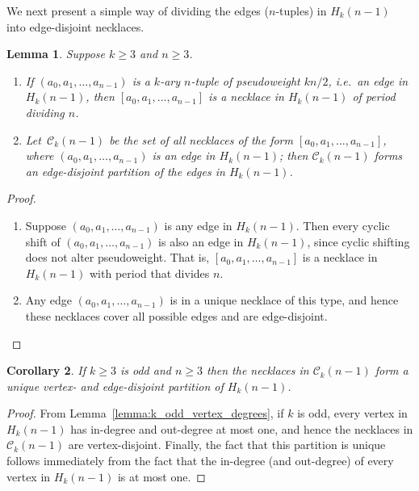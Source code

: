 \documentclass[a4paper,11pt]{article}
\theoremstyle{plain}
\newtheorem{lemma}{Lemma}[section]
\newtheorem{corollary}[lemma]{Corollary}
\theoremstyle{definition}
\theoremstyle{remark}
\begin{document}
We next present a simple way of dividing the edges ($n$-tuples) in $H_k(n-1)$ into edge-disjoint
necklaces.

\begin{lemma}  \label{lemma:k_odd_partitioning edges}  \label{lemma:defining_circuits}
Suppose $k\geq3$ and $n\geq 3$.
\begin{enumerate}
\item[i)] If $(a_0,a_1,\dots,a_{n-1})$ is a $k$-ary $n$-tuple of pseudoweight $kn/2$, i.e.\ an
    edge in $H_k(n-1)$, then $[a_0,a_1,\dots,a_{n-1}]$ is a necklace in $H_k(n-1)$ of
     period dividing $n$.
\item[ii)] Let~$\mathcal{C}_k(n-1)$ be the set of all necklaces of the form
    $[a_0,a_1,\dots,a_{n-1}]$, where $(a_0,a_1,\dots,a_{n-1})$ is an edge in $H_k(n-1)$; then
    $\mathcal{C}_k(n-1)$ forms an edge-disjoint partition of the edges in $H_k(n-1)$.
\end{enumerate}
\end{lemma}

\begin{proof}
\begin{enumerate}
\item[i)] Suppose $(a_0,a_1,\dots,a_{n-1})$ is any edge in $H_k(n-1)$.  Then every cyclic shift
    of $(a_0,a_1,\dots,a_{n-1})$ is also an edge in $H_k(n-1)$, since cyclic shifting does not
    alter pseudoweight.  That is, $[a_0,a_1,\dots,a_{n-1}]$ is a necklace in $H_k(n-1)$ with
    period that divides $n$.
\item[ii)] Any edge $(a_0,a_1,\dots,a_{n-1})$ is in a unique necklace of this type, and hence
    these necklaces cover all possible edges and are edge-disjoint.
\end{enumerate}
\end{proof}

\begin{corollary}
If $k\geq3$ is odd and $n\geq3$ then the necklaces in $\mathcal{C}_k(n-1)$ form a unique vertex-
and edge-disjoint partition of $H_k(n-1)$.
\end{corollary}

\begin{proof}
From Lemma~\ref{lemma:k_odd_vertex_degrees}, if $k$ is odd, every vertex in $H_k(n-1)$ has
in-degree and out-degree at most one, and hence the necklaces in $\mathcal{C}_k(n-1)$ are
vertex-disjoint. Finally, the fact that this partition is unique follows immediately from the fact
that the in-degree (and out-degree) of every vertex in $H_k(n-1)$ is at most one.
\end{proof}
\end{document}
